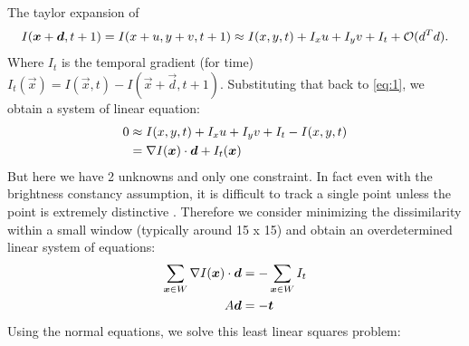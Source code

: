 The taylor expansion of $$I(\boldsymbol{x}+\boldsymbol{d}, t+1) = I(x+u, y+v, t+1) \approx I(x,y,t) + I_xu +
I_yv +  I_t +  \mathcal{O}(d^Td).$$  Where $I_t$ is the temporal
gradient (for time) $I_t(\vec x) =I(\vec x, t) - I(\vec x+\vec d,
t+1)$. Substituting that back to \eqref{eq:1}, we obtain a system of
linear equation:
\begin{align*}
0 &\approx I(x,y,t) + I_xu +I_yv  + I_t - I(x,y,t)\\
&= \nabla I(\boldsymbol{x})\cdot \boldsymbol{d} + I_t(\boldsymbol{x})
\end{align*}
But here we have 2 unknowns and only one constraint. In fact even with the brightness
constancy assumption, it is difficult to track a single point unless
the point is extremely distinctive \cite{KLT}. Therefore we consider minimizing
the dissimilarity within a small window (typically around 15 x 15) and
obtain an overdetermined linear system of equations:
\begin{align*}
\sum_{\boldsymbol{x}\in W} \nabla I(\boldsymbol{x}) \cdot \boldsymbol{d} &= - \sum_{\boldsymbol{x}\in W}
I_t \\
A\boldsymbol{d} &= -\boldsymbol{t}
\end{align*}
Using the normal equations, we solve this least linear squares
problem:

